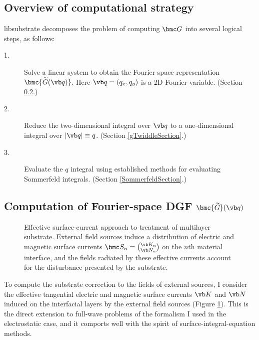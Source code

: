 \documentclass[letterpaper]{article}
\renewcommand{\wt}{\widetilde}
\begin{document}
\subsection{Overview of computational strategy}
\label{libSubstrateStrategy}

{\sc libsubstrate} decomposes the problem of computing
$\bmc G$ into several logical steps, as follows:

\begin{description}
 \item[1.] Solve a linear system to obtain the Fourier-space
             representation $\bmc{\wt G(\vb q)}$. Here $\vb q=(q_x,q_y)$ is a
             2D Fourier variable. (Section \ref{GTwiddleSection}.)
 \item[2.] Reduce the two-dimensional integral over $\vb q$ to a
             one-dimensional integral over $|\vb q|\equiv q$.
             (Section \ref{gTwiddleSection}.)
 \item[3.] Evaluate the $q$ integral using established methods for
             evaluating Sommerfeld integrals.
             (Section \ref{SommerfeldSection}.)
\end{description}

\newpage
\subsection{Computation of Fourier-space DGF $\bmc{\wt G}(\vb q)$}
\label{GTwiddleSection}

\begin{figure}[t]
\begin{center}
\caption{Effective surface-current approach to treatment of
multilayer substrate. External field sources induce a distribution
of electric and magnetic surface currents $\bmc S_n={\vb K_n \choose \vb N_n}$
on the $n$th material interface, and the fields radiated by these
effective currents account for the disturbance presented by
the substrate.}
\label{SurfaceCurrentFigure}
\end{center}
\end{figure}
To compute the substrate correction to the fields of external sources,
I consider the effective tangential electric and magnetic
surface currents $\vb K$ and $\vb N$ induced on the interfacial 
layers by the external field sources 
(Figure \ref{SurfaceCurrentFigure}). This is the direct extension
to full-wave problems of the formalism I used in the electrostatic
case, and it comports well with the spirit of
surface-integral-equation methods.
\end{document}
